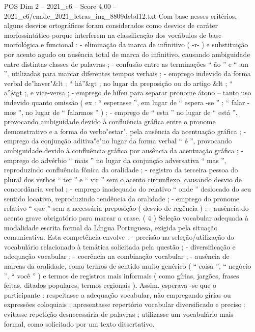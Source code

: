 \begin{textsample}{POS Dim 2 – 2021\_c6 – Score 4.00 – 2021\_c6/enade\_2021\_letras\_ing\_8809dcbd12.txt}
Com base nesses critérios, alguns desvios ortográficos foram considerados como desvios de caráter morfossintático porque interferem na classificação dos vocábulos de base morfológica e funcional : - eliminação da marca de infinitivo ( -r- ) e substituição por acento agudo ou ausência total de marca do infinitivo, causando ambiguidade entre distintas classes de palavras ; - confusão entre as terminações “ ão ” e “ am ”, utilizadas para marcar diferentes tempos verbais ; - emprego indevido da forma verbal de"haver"\&lt ; “ há”\&gt ; no lugar da preposição ou do artigo \&lt ; “ a”\&gt ;, e vice-versa ; - emprego de hífen para separar pronome átono – tanto uso indevido quanto omissão ( ex : “ esperasse ”, em lugar de “ espera -se ” ; “ falar -mos ”, no lugar de “ falarmos ” ) ; - emprego de “ esta ” no lugar de “ está ”, provocando ambiguidade devido à confluência gráfica entre o pronome demonstrativo e a forma do verbo"estar", pela ausência da acentuação gráfica ; - emprego da conjunção aditiva"e"no lugar da forma verbal “ é ”, provocando ambiguidade devido à confluência gráfica por ausência da acentuação gráfica ; - emprego do advérbio “ mais ” no lugar da conjunção adversativa “ mas ”, reproduzindo confluência fônica da oralidade ; - registro da terceira pessoa do plural dos verbos “ ter ” e “ vir ” sem o acento circunflexo, causando desvio de concordância verbal ; - emprego inadequado do relativo “ onde ” deslocado do seu sentido locativo, reproduzindo tendência da oralidade ; - emprego do pronome relativo “ que ” sem a necessária preposição ( desvio de regência ) ; - ausência do acento grave obrigatório para marcar a crase. ( 4 ) Seleção vocabular adequada à modalidade escrita formal da Língua Portuguesa, exigida pela situação comunicativa.
Esta competência envolve : - precisão na seleção/utilização do vocabulário relacionado à temática solicitada pela questão ; - diversificação e adequação vocabular ; - coerência na combinação vocabular ; - ausência de marcas da oralidade, como termos de sentido muito genérico ( “ coisa ”, “ negócio ”, “ você ” ) e termos de registros mais informais ( como gírias, jargões, frases feitas, ditados populares, termos regionais ).
Assim, esperava -se que o participante : respeitasse a adequação vocabular, não empregando gírias ou expressões coloquiais ; apresentasse repertório vocabular diversificado e preciso ; evitasse repetição desnecessária de palavras ; utilizasse um vocabulário mais formal, como solicitado por um texto dissertativo.

\end{textsample}
